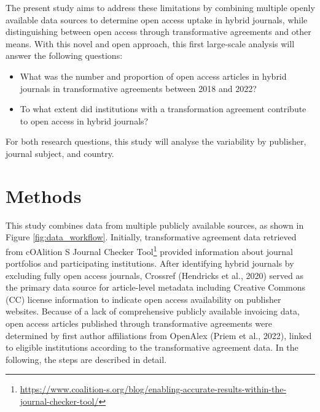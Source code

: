 \documentclass[a4paper,man,floatsintext,longtable,noextraspace,12pt]{apa6}
\providecommand{\tightlist}{%
  \setlength{\itemsep}{0pt}\setlength{\parskip}{0pt}}
\begin{document}
The present study aims to address these limitations by combining
multiple openly available data sources to determine open access uptake
in hybrid journals, while distinguishing between open access through
transformative agreements and other means. With this novel and open
approach, this first large-scale analysis will answer the following
questions:

\begin{itemize}
\tightlist
\item
  What was the number and proportion of open access articles in hybrid
  journals in transformative agreements between 2018 and 2022?
\item
  To what extent did institutions with a transformation agreement
  contribute to open access in hybrid journals?
\end{itemize}

For both research questions, this study will analyse the variability by
publisher, journal subject, and country.

\section{Methods}\label{methods}

This study combines data from multiple publicly available sources, as
shown in Figure \ref{fig:data_workflow}. Initially, transformative
agreement data retrieved from cOAlition S Journal Checker
Tool\footnote{\url{https://www.coalition-s.org/blog/enabling-accurate-results-within-the-journal-checker-tool/}}
provided information about journal portfolios and participating
institutions. After identifying hybrid journals by excluding fully open
access journals, Crossref (Hendricks et al., 2020) served as the primary
data source for article-level metadata including Creative Commons (CC)
license information to indicate open access availability on publisher
websites. Because of a lack of comprehensive publicly available
invoicing data, open access articles published through transformative
agreements were determined by first author affiliations from OpenAlex
(Priem et al., 2022), linked to eligible institutions according to the
transformative agreement data. In the following, the steps are described
in detail.
\end{document}
